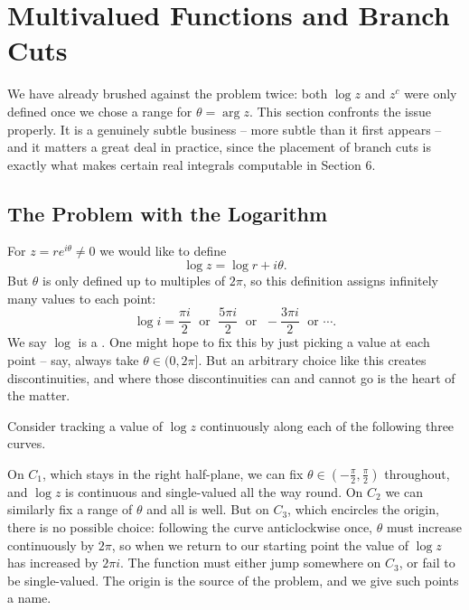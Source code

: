 \documentclass[a4paper]{scrartcl}
\begin{document}
\section{Multivalued Functions and Branch Cuts}

We have already brushed against the problem twice: both $\log z$ and $z^c$ were only defined once we chose a range for $\theta = \arg z$. This section confronts the issue properly. It is a genuinely subtle business -- more subtle than it first appears -- and it matters a great deal in practice, since the placement of branch cuts is exactly what makes certain real integrals computable in Section 6.

\subsection{The Problem with the Logarithm}

For $z = re^{i\theta} \neq 0$ we would like to define
$$
\log z = \log r + i\theta.
$$
But $\theta$ is only defined up to multiples of $2\pi$, so this definition assigns infinitely many values to each point:
$$
\log i = \frac{\pi i}{2} \;\text{ or }\; \frac{5\pi i}{2} \;\text{ or }\; -\frac{3\pi i}{2} \;\text{ or } \cdots.
$$
We say $\log$ is a . One might hope to fix this by just picking a value at each point -- say, always take $\theta \in (0, 2\pi]$. But an arbitrary choice like this creates discontinuities, and where those discontinuities can and cannot go is the heart of the matter.

Consider tracking a value of $\log z$ continuously along each of the following three curves.

\begin{center}
\end{center}

On $C_1$, which stays in the right half-plane, we can fix $\theta \in (-\frac{\pi}{2}, \frac{\pi}{2})$ throughout, and $\log z$ is continuous and single-valued all the way round. On $C_2$ we can similarly fix a range of $\theta$ and all is well. But on $C_3$, which encircles the origin, there is no possible choice: following the curve anticlockwise once, $\theta$ must increase continuously by $2\pi$, so when we return to our starting point the value of $\log z$ has increased by $2\pi i$. The function must either jump somewhere on $C_3$, or fail to be single-valued. The origin is the source of the problem, and we give such points a name.
\end{document}
